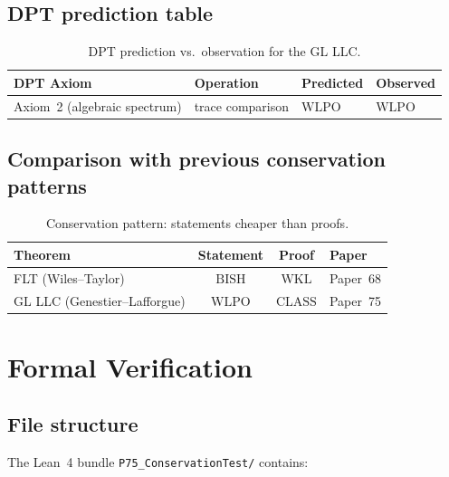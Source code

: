 \documentclass[12pt, a4paper]{article}
\theoremstyle{plain}
\theoremstyle{definition}
\theoremstyle{remark}
\newcommand{\BISH}{\mathrm{BISH}}
\newcommand{\WKL}{\mathrm{WKL}}
\newcommand{\WLPO}{\mathrm{WLPO}}
\newcommand{\CLASS}{\mathrm{CLASS}}
\begin{document}
\subsection{DPT prediction table}

\begin{table}[h]
\centering
\begin{tabular}{llll}
\toprule
\textbf{DPT Axiom} & \textbf{Operation} & \textbf{Predicted} & \textbf{Observed} \\
\midrule
Axiom~2 (algebraic spectrum) & trace comparison & $\WLPO$ & $\WLPO$ \\
\bottomrule
\end{tabular}
\caption{DPT prediction vs.\ observation for the GL LLC.}
\label{tab:prediction}
\end{table}

\subsection{Comparison with previous conservation patterns}

\begin{table}[h]
\centering
\begin{tabular}{lccl}
\toprule
\textbf{Theorem} & \textbf{Statement} & \textbf{Proof} & \textbf{Paper} \\
\midrule
FLT (Wiles--Taylor) & $\BISH$ & $\WKL$ & Paper~68 \\
GL LLC (Genestier--Lafforgue) & $\WLPO$ & $\CLASS$ & Paper~75 \\
\bottomrule
\end{tabular}
\caption{Conservation pattern: statements cheaper than proofs.}
\label{tab:conservation}
\end{table}


\section{Formal Verification}\label{sec:lean}

\subsection{File structure}

The Lean~4 bundle \texttt{P75\_ConservationTest/} contains:
\end{document}

